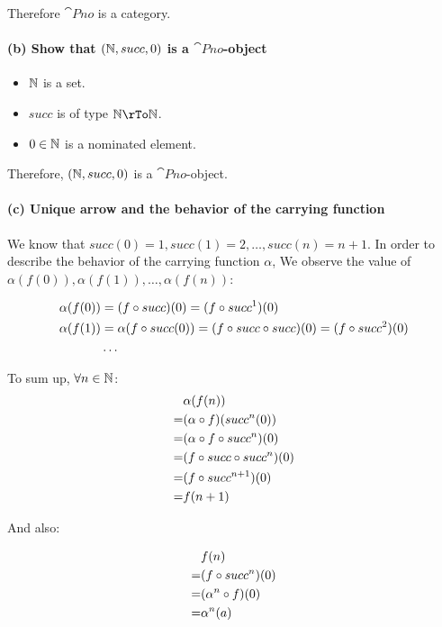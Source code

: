 Therefore $\cat{Pno}$ is a category.

\paragraph{(b) Show that $(\mathbb{N}, succ, 0)$ is a $\cat{Pno}$-object}

\begin{itemize}
  \item $\mathbb{N}$ is a set.
  \item $succ$ is of type $\nat \rTo \nat$.
  \item $0 \in \mathbb{N}$ is a nominated element.
\end{itemize}

Therefore, $(\mathbb{N}, succ, 0)$ is a $\cat{Pno}$-object.

\paragraph{(c) Unique arrow and the behavior of the carrying function}\mbox{}

We know that $succ(0) = 1, succ(1) = 2, \ldots, succ(n) = n + 1$.
In order to describe the behavior of the carrying function $\alpha$,
We observe the value of $\alpha(f(0)), \alpha(f(1)), \ldots, \alpha(f(n))$:

\begin{align*}
\alpha(f(0)) & = (f \circ succ)(0) = (f \circ succ^1)(0) \\
\alpha(f(1)) & = \alpha(f \circ succ (0)) = (f \circ succ \circ succ)(0)
= (f \circ succ^2)(0) \\
& \ldots
\end{align*}

To sum up, $\forall n \in \mathbb{N}$:
\begin{align*}
& \alpha(f(n)) \\
= &(\alpha \circ f)(succ^n(0)) \\
= &(\alpha \circ f \circ succ^n) (0) \\
= &(f \circ succ \circ succ^n) (0) \\
= &(f \circ succ^{n+1})(0) \\
= &f(n+1)
\end{align*}

And also:

\begin{align*}
& f(n) \\
= & (f \circ succ^{n})(0) \\
= & (\alpha^n \circ f)(0) \\
= & \alpha^n(a)
\end{align*}

